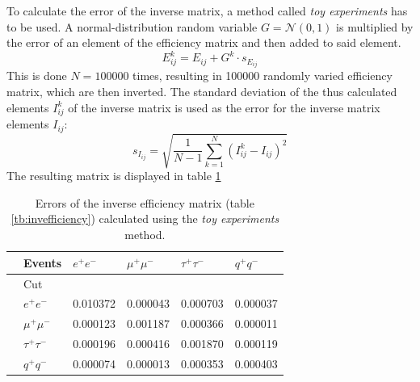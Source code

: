To calculate the error of the inverse matrix, a method called \emph{toy experiments} has to be used. A normal-distribution random variable $G=\mathcal{N}(0,1)$ is multiplied by the error of an element of the efficiency matrix and then added to said element.
\begin{equation}
E^{k}_{ij}=E_{ij}+G^k\cdot s_{E_{ij}}
\end{equation}
This is done $N=100000$ times, resulting in 100000 randomly varied efficiency matrix, which are then inverted. The standard deviation of the thus calculated elements $I^k_{ij}$ of the inverse matrix is used as the error for the inverse matrix elements $I_{ij}$: 
\begin{equation}
s_{I_{ij}}=\sqrt{\frac{1}{N-1}\sum_{k=1}^{N}\left(I^k_{ij}-I_{ij}\right)^2}
\end{equation}
The resulting matrix is displayed in table \ref{tb:invefficiencyerror}
\begin{table}[H]\centering
	\begin{tabular}{@{}llllll@{}}
		\toprule
		&Events &$e^+e^-$&$\mu^+\mu^-$&$\tau^+\tau^-$&$q^+q^-$\\
		\midrule
		&Cut&&&&\\
		&$e^+e^-$&0.010372&0.000043&0.000703&0.000037\\
		&$\mu^+\mu^-$&0.000123&0.001187&0.000366&0.000011\\
		&$\tau^+\tau^-$&0.000196&0.000416&0.001870&0.000119\\
		&$q^+q^-$&0.000074&0.000013&0.000353&0.000403\\
		\bottomrule
	\end{tabular}
	\caption[Inverse efficiency error matrix]{Errors of the inverse efficiency matrix (table \ref{tb:invefficiency}) calculated using the \emph{toy experiments} method.}
	\label{tb:invefficiencyerror}
\end{table}

